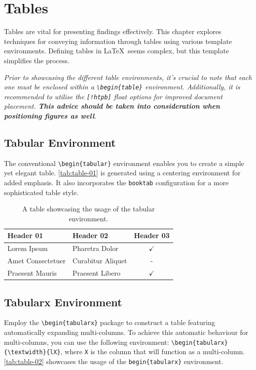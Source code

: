 {\section{Tables}
Tables are vital for presenting findings effectively. This chapter explores techniques for conveying information through tables using various template environments. Defining tables in \LaTeX\ seems complex, but this template simplifies the process.

\begin{block}[tip]
\textit{Prior to showcasing the different table environments, it's crucial to note that each one must be enclosed within a \texttt{\textbackslash begin\{table\}} environment. Additionally, it is recommended to utilise the \texttt{[!htpb]} float options for improved document placement. \textbf{This advice should be taken into consideration when positioning figures as well}.}
\end{block}

\subsection{Tabular Environment}
The conventional \verb|\begin{tabular}| environment enables you to create a simple yet elegant table. \autoref{tab:table-01} is generated using a centering environment for added emphasis. It also incorporates the \verb|booktab| configuration for a more sophisticated table style.

\begin{table}[!htpb]
    \caption{A table showcasing the usage of the tabular environment.}
    \label{tab:table-01}
    \centering
    \begin{tabular}{llc}
        \toprule
        \textbf{Header 01} & \textbf{Header 02} & \textbf{Header 03} \\ 
        \midrule
        Lorem Ipsum         & Pharetra Dolor    & $\checkmark$  \\
        Amet Consectetuer   & Curabitur Aliquet & -             \\
        Praesent Mauris     & Praesent Libero   & $\checkmark$  \\
        \bottomrule
    \end{tabular}
\end{table}

\subsection{Tabularx Environment}
Employ the \verb|\begin{tabularx}| package to construct a table featuring automatically expanding multi-columns. To achieve this automatic behaviour for multi-columns, you can use the following environment: \verb|\begin{tabularx}{\textwidth}{lX}|, where \verb|X| is the column that will function as a multi-column. \autoref{tab:table-02} showcases the usage of the \verb|begin{tabularx}| environment.

}
